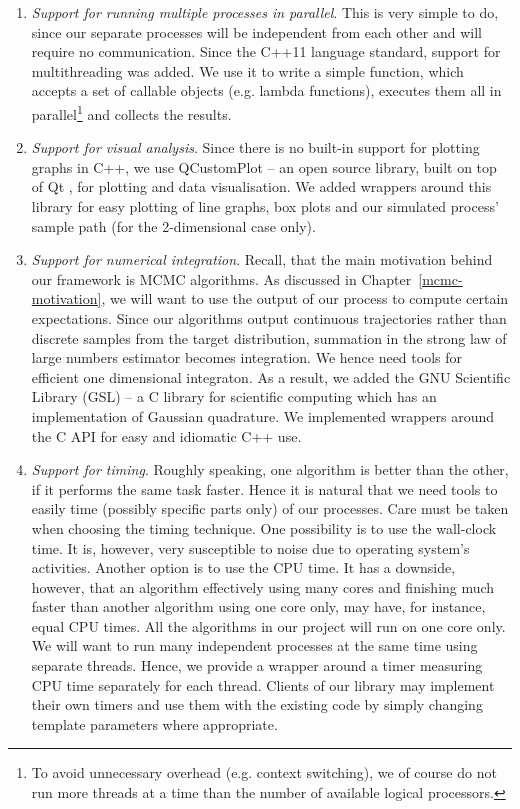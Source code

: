 \documentclass[report.tex]{subfiles}
\begin{document}
\begin{enumerate}
  \item \textit{Support for running multiple processes in parallel}. This is very
    simple to do, since our separate processes will be independent from each other
    and will require no communication.
    Since the C++11 language standard, support for multithreading was added.
    We use it to write a simple function,
    which accepts a set of callable objects (e.g. lambda functions),
    executes them all in parallel\footnote{To avoid unnecessary overhead
    (e.g. context switching), we of course do not run more threads at a time
    than the number of available logical processors.} and collects the results.

  \item \textit{Support for visual analysis}.
    Since there is no built-in support for plotting graphs in C++, we use
    QCustomPlot \cite{qcustomplot-library} -- an open source library, built on top of Qt
    \cite{qt-library}, for plotting and data visualisation.
    We added wrappers around this library for easy plotting of line graphs,
    box plots and our simulated process' sample path (for the 2-dimensional case only).

  \item \textit{Support for numerical integration}.
    Recall, that the main motivation behind our framework is MCMC algorithms.
    As discussed in Chapter~\ref{mcmc-motivation}, we will want to use the output
    of our process to compute certain expectations.
    Since our algorithms output continuous trajectories rather than discrete samples
    from the target distribution, summation in the strong law of large numbers estimator
    becomes integration. We hence need tools for efficient one dimensional integraton.
    As a result, we added the GNU Scientific Library (GSL) \cite{gsl-library} --
    a C library for scientific computing
    which has an implementation of Gaussian quadrature.
    We implemented wrappers around the C API for easy and idiomatic C++ use.

  \item \textit{Support for timing}.
    Roughly speaking, one algorithm is better than the other, if it performs
    the same task faster. Hence it is natural that we need tools to easily time
    (possibly specific parts only) of our processes. Care must be taken when choosing the
    timing technique. One possibility is to use the wall-clock time.
    It is, however, very susceptible to noise due to operating system's activities.
    Another option is to use the CPU time. It has a downside, however, that an
    algorithm effectively using many cores and finishing much faster than another
    algorithm using one core only, may have, for instance, equal CPU times.
    All the algorithms in our project will run on one core only. We will want to run
    many independent processes at the same time using separate threads. Hence, we
    provide a wrapper around a timer measuring CPU time separately for each thread.
    Clients of our library may implement their own timers and use them with the existing code
    by simply changing template parameters where appropriate.
\end{enumerate}
\end{document}

